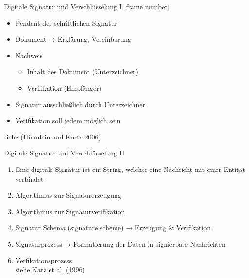 
\begin{frame}{Digitale Signatur und Verschlüsselung I}
[frame number]
\protect\hypertarget{digitale-signatur-und-verschluxfcsselung-i}{}
\begin{itemize}
\tightlist
\item
  Pendant der schriftlichen Signatur
\end{itemize}

\pause

\begin{itemize}
\tightlist
\item
  Dokument → Erklärung, Vereinbarung
\end{itemize}

\pause

\begin{itemize}
\tightlist
\item
  Nachweis

  \begin{itemize}
  \tightlist
  \item
    Inhalt des Dokument (Unterzeichner)
  \item
    Verifikation (Empfänger)
  \end{itemize}
\end{itemize}

\pause

\begin{itemize}
\tightlist
\item
  Signatur ausschließlich durch Unterzeichner
\end{itemize}

\pause

\begin{itemize}
\tightlist
\item
  Verifikation soll jedem möglich sein
\end{itemize}

siehe (Hühnlein and Korte 2006)
\end{frame}

\begin{frame}{Digitale Signatur und Verschlüsselung II}
\protect\hypertarget{digitale-signatur-und-verschluxfcsselung-ii}{}
\begin{enumerate}
\tightlist
\item
  Eine digitale Signatur ist ein String, welcher eine Nachricht mit
  einer Entität verbindet
\item
  Algorithmus zur Signaturerzeugung\\
\item
  Algorithmus zur Signaturverifikation
\item
  Signatur Schema (signature scheme) → Erzeugung \& Verifikation
\item
  Signaturprozess → Formatierung der Daten in signierbare Nachrichten
\item
  Verfikationsprozess\\
  siehe Katz et al. (1996)
\end{enumerate}
\end{frame}

